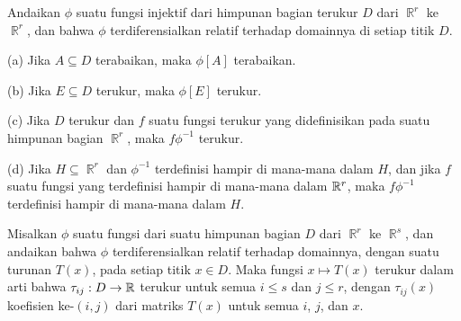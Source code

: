 
 Andaikan $\phi$ suatu fungsi injektif dari himpunan
bagian terukur $D$ dari $\BbbR^r$ ke $\BbbR^r$, dan bahwa $\phi$
terdiferensialkan relatif terhadap domainnya di setiap titik $D$.

(a) Jika $A\subseteq D$ terabaikan, maka $\phi[A]$ terabaikan.

(b) Jika $E\subseteq D$ terukur, maka $\phi[E]$ terukur.

(c) Jika $D$ terukur dan $f$ suatu fungsi terukur yang didefinisikan pada
suatu himpunan bagian $\BbbR^r$, maka $f\phi^{-1}$ terukur.

(d) Jika $H\subseteq\BbbR^r$ dan $\phi^{-1}$ terdefinisi hampir di
mana-mana dalam $H$, dan jika $f$ suatu fungsi yang terdefinisi hampir di
mana-mana dalam $\Bbb R^r$, maka $f\phi^{-1}$ terdefinisi hampir di
mana-mana dalam $H$.


 Misalkan $\phi$ suatu fungsi dari suatu himpunan
bagian $D$ dari $\BbbR^r$ ke $\BbbR^s$, dan andaikan bahwa $\phi$
terdiferensialkan relatif terhadap domainnya, dengan suatu turunan
$T(x)$, pada setiap titik $x\in D$. Maka fungsi $x\mapsto T(x)$ terukur dalam
arti bahwa $\tau_{ij}:D\to\Bbb R$ terukur untuk semua $i\le s$ dan
$j\le r$, dengan $\tau_{ij}(x)$ koefisien ke-$(i,j)$ dari matriks $T(x)$
untuk semua $i$, $j$, dan $x$.



